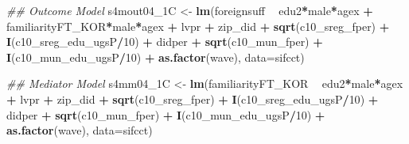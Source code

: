 \documentclass[
]{article}
\newenvironment{Shaded}{\begin{snugshade}}{\end{snugshade}}
\newcommand{\CommentTok}[1]{\textcolor[rgb]{0.56,0.35,0.01}{\textit{#1}}}
\newcommand{\DataTypeTok}[1]{\textcolor[rgb]{0.13,0.29,0.53}{#1}}
\newcommand{\DecValTok}[1]{\textcolor[rgb]{0.00,0.00,0.81}{#1}}
\newcommand{\KeywordTok}[1]{\textcolor[rgb]{0.13,0.29,0.53}{\textbf{#1}}}
\newcommand{\NormalTok}[1]{#1}
\newcommand{\OperatorTok}[1]{\textcolor[rgb]{0.81,0.36,0.00}{\textbf{#1}}}
\newcommand{\StringTok}[1]{\textcolor[rgb]{0.31,0.60,0.02}{#1}}
\begin{document}
\begin{Shaded}
\begin{Highlighting}[]
\CommentTok{## Outcome Model }
\NormalTok{s4mout04_1C <-}\StringTok{ }\KeywordTok{lm}\NormalTok{(foreignsuff  }\OperatorTok{~}\StringTok{ }\NormalTok{edu2}\OperatorTok{*}\NormalTok{male}\OperatorTok{*}\NormalTok{agex }\OperatorTok{+}\StringTok{ }\NormalTok{familiarityFT_KOR}\OperatorTok{*}\NormalTok{male}\OperatorTok{*}\NormalTok{agex }\OperatorTok{+}\StringTok{ }\NormalTok{lvpr }\OperatorTok{+}\StringTok{  }
\StringTok{                    }\NormalTok{zip_did }\OperatorTok{+}\StringTok{ }\KeywordTok{sqrt}\NormalTok{(c10_sreg_fper) }\OperatorTok{+}\StringTok{ }\KeywordTok{I}\NormalTok{(c10_sreg_edu_ugsP}\OperatorTok{/}\DecValTok{10}\NormalTok{) }\OperatorTok{+}\StringTok{ }
\StringTok{                    }\NormalTok{didper }\OperatorTok{+}\StringTok{ }\KeywordTok{sqrt}\NormalTok{(c10_mun_fper) }\OperatorTok{+}\StringTok{ }\KeywordTok{I}\NormalTok{(c10_mun_edu_ugsP}\OperatorTok{/}\DecValTok{10}\NormalTok{) }\OperatorTok{+}\StringTok{ }
\StringTok{                    }\KeywordTok{as.factor}\NormalTok{(wave), }\DataTypeTok{data=}\NormalTok{sifcct)}

\CommentTok{## Mediator Model}
\NormalTok{s4mm04_1C <-}\StringTok{ }\KeywordTok{lm}\NormalTok{(familiarityFT_KOR  }\OperatorTok{~}\StringTok{ }\NormalTok{edu2}\OperatorTok{*}\NormalTok{male}\OperatorTok{*}\NormalTok{agex }\OperatorTok{+}\StringTok{ }\NormalTok{lvpr }\OperatorTok{+}\StringTok{  }
\StringTok{                  }\NormalTok{zip_did }\OperatorTok{+}\StringTok{ }\KeywordTok{sqrt}\NormalTok{(c10_sreg_fper) }\OperatorTok{+}\StringTok{ }\KeywordTok{I}\NormalTok{(c10_sreg_edu_ugsP}\OperatorTok{/}\DecValTok{10}\NormalTok{) }\OperatorTok{+}\StringTok{ }
\StringTok{                  }\NormalTok{didper }\OperatorTok{+}\StringTok{ }\KeywordTok{sqrt}\NormalTok{(c10_mun_fper) }\OperatorTok{+}\StringTok{ }\KeywordTok{I}\NormalTok{(c10_mun_edu_ugsP}\OperatorTok{/}\DecValTok{10}\NormalTok{) }\OperatorTok{+}\StringTok{ }
\StringTok{                  }\KeywordTok{as.factor}\NormalTok{(wave), }\DataTypeTok{data=}\NormalTok{sifcct)}


\end{Highlighting}
\end{Shaded}
\end{document}
